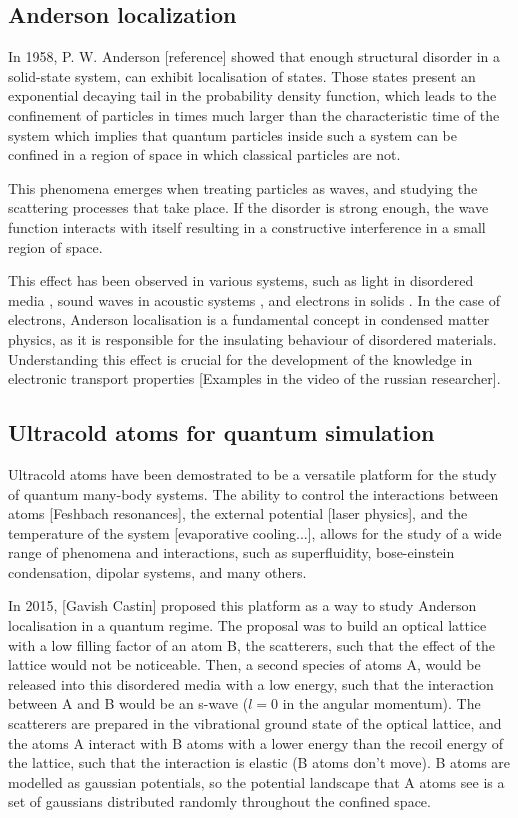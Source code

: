 \subsection{Anderson localization}

In 1958, P. W. Anderson [reference] showed that enough structural disorder in a solid-state system, can exhibit localisation of states. Those states present an exponential decaying tail in the probability density function, which leads to the confinement of particles in times much larger than the characteristic time of the system which implies that quantum particles inside such a system can be confined in a region of space in which classical particles are not.

This phenomena emerges when treating particles as waves, and studying the scattering processes that take place. If the disorder is strong enough, the wave function interacts with itself resulting in a constructive interference in a small region of space.

This effect has been observed in various systems, such as light in disordered media \cite{wiersma_localization_1997}, sound waves in acoustic systems \cite{hu_localization_2018}, and electrons in solids \cite{abrahams_scaling_1979}. In the case of electrons, Anderson localisation is a fundamental concept in condensed matter physics, as it is responsible for the insulating behaviour of disordered materials. Understanding this effect is crucial for the development of the knowledge in electronic transport properties [Examples in the video of the russian researcher].

\subsection{Ultracold atoms for quantum simulation}

Ultracold atoms have been demostrated to be a versatile platform for the study of quantum many-body systems. The ability to control the interactions between atoms [Feshbach resonances], the external potential [laser physics], and the temperature of the system [evaporative cooling...], allows for the study of a wide range of phenomena and interactions, such as superfluidity, bose-einstein condensation, dipolar systems, and many others.

In 2015, [Gavish Castin] proposed this platform as a way to study Anderson localisation in a quantum regime. The proposal was to build an optical lattice with a low filling factor of an atom B, the scatterers, such that the effect of the lattice would not be noticeable. Then, a second species of atoms A, would be released into this disordered media with a low energy, such that the interaction between A and B would be an s-wave ($l=0$ in the angular momentum). The scatterers are prepared in the vibrational ground state of the optical lattice, and the atoms A interact with B atoms with a lower energy than the recoil energy of the lattice, such that the interaction is elastic (B atoms don't move). B atoms are modelled as gaussian potentials, so the potential landscape that A atoms see is a set of gaussians distributed randomly throughout the confined space.

